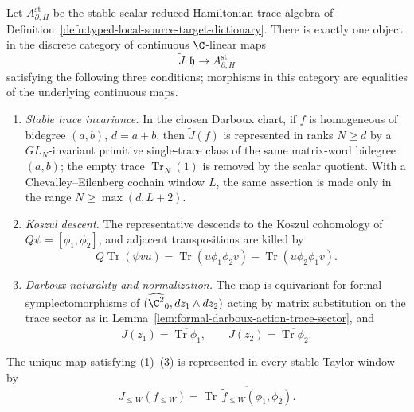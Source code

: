 \documentclass[11pt]{memoir}
\begin{document}
\begin{prop}
\label{prop:J-three-input-uniqueness}
  Let \(A_{\partial,H}^{\mathrm{st}}\) be the stable scalar-reduced
  Hamiltonian trace algebra of
  Definition~\ref{defn:typed-local-source-target-dictionary}.  There is
  exactly one object in the discrete category of continuous
  \(\C\)-linear maps
  \[
    \widetilde J\colon \mathfrak h\longrightarrow
    A_{\partial,H}^{\mathrm{st}}
  \]
  satisfying the following three conditions; morphisms in this category
  are equalities of the underlying continuous maps.
  \begin{enumerate}[label=\textup{(\arabic*)}]
    \item \emph{Stable trace invariance.}  In the chosen Darboux chart,
      if \(f\) is homogeneous of bidegree \((a,b)\), \(d=a+b\), then
      \(\widetilde J(f)\) is represented in ranks \(N\geq d\) by a
      \(GL_N\)-invariant primitive single-trace class of the same
      matrix-word bidegree \((a,b)\); the empty trace
      \(\operatorname{Tr}_N(1)\) is removed by the scalar quotient.  With
      a Chevalley--Eilenberg cochain window \(L\), the same assertion is
      made only in the range \(N\geq\max(d,L+2)\).
    \item \emph{Koszul descent.}  The representative descends to the
      Koszul cohomology of \(Q\psi=[\phi_1,\phi_2]\), and adjacent
      transpositions are killed by
      \[
        Q\operatorname{Tr}(\psi vu)
        =
        \operatorname{Tr}(u\phi_1\phi_2v)
        -\operatorname{Tr}(u\phi_2\phi_1v).
      \]
    \item \emph{Darboux naturality and normalization.}  The map is
      equivariant for formal symplectomorphisms of
      \((\widehat{\C^2}_0,dz_1\wedge dz_2)\) acting by matrix
      substitution on the trace sector as in
      Lemma~\ref{lem:formal-darboux-action-trace-sector}, and
      \[
        \widetilde J(z_1)=\overline{\operatorname{Tr}\phi_1},\qquad
        \widetilde J(z_2)=\overline{\operatorname{Tr}\phi_2}.
      \]
  \end{enumerate}
  The unique map satisfying \textup{(1)--(3)} is represented in every
  stable Taylor window by
  \[
    J_{\leq W}(f_{\leq W})
    =\overline{\operatorname{Tr}\,\tilde f_{\leq W}(\phi_1,\phi_2)}.
  \]
\end{prop}
\end{document}
